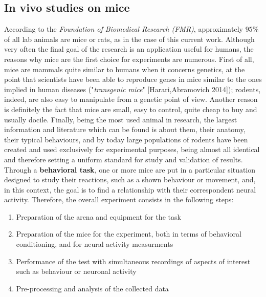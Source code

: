 \documentclass[a4paper]{article}
\begin{document}
\newpage

\subsection{In vivo studies on mice}

According to the \textit{Foundation of Biomedical Research (FMR)}, approximately $95\% $ of all lab animals are mice or rats, as in the case of this current work. Although very often the final goal of the research is an application useful for humans, the reasons why mice are the first choice for experiments are numerous. First of all, mice are mammals quite similar to humans when it concerns genetics, at the point that scientists have been able to reproduce genes in mice similar to the ones implied in human diseases ("\textit{transgenic mice}" [Harari,Abramovich 2014]); rodents, indeed, are also easy to manipulate from a genetic point of view. Another reason is definitely the fact that mice are small, easy to control, quite cheap to buy and usually docile. Finally, being the most used animal in research, the largest information and literature which can be found is about them, their anatomy, their typical behaviours, and by today large populations of rodents have been created and used exclusively for experimental purposes, being almost all identical and therefore setting a uniform standard for study and validation of results. \\
Through a  \textbf{behavioral task}, one or more mice are put in a particular situation designed to study their reactions, such as a shown behaviour or movement, and, in this context, the goal is to find a relationship with their correspondent neural activity. Therefore, the overall experiment consists in the following steps:
\begin{enumerate}
	\item Preparation of the arena and equipment for the task 
	\item Preparation of the mice for the experiment, both in terms of behavioral conditioning, and for neural activity measurments
	\item Performance of the test with simultaneous recordings of  aspects of interest such as behaviour or neuronal activity
	\item Pre-processing and analysis of the collected data
\end{enumerate}
\end{document}
